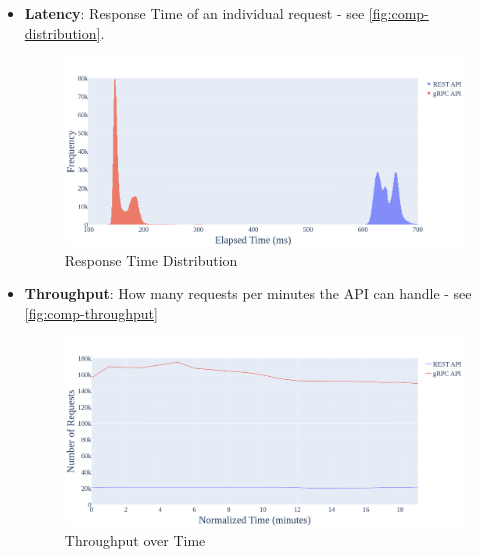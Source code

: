 \begin{itemize}
    \item 
        \textbf{Latency}: Response Time of an individual request - see \autoref{fig:comp-distribution}.
        
        \begin{figure}[htpb]
            \centering
                \includegraphics[width=\linewidth]{images/plots/comp/response_time_distribution.png}
            \caption[Response Time Distribution]{Response Time Distribution}\label{fig:comp-distribution}
        \end{figure}
    \item 
        \textbf{Throughput}: How many requests per minutes the \ac{API} can handle - see \autoref{fig:comp-throughput}
        \begin{figure}[htpb]
            \centering
                \includegraphics[width=\linewidth]{images/plots/comp/throughput_over_time.png}
            \caption[Throughput over Time]{Throughput over Time}\label{fig:comp-throughput}
        \end{figure}
\end{itemize}

